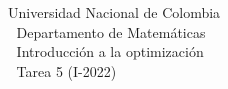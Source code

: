 \documentclass[12pt, oneside]{article}%
\begin{document}
\setlength{\parindent}{0cm}%
\hoffset-0.46cm
\voffset-1.46cm

\begin{window}
\Large  \hspace{0.5cm}\textsf{Universidad Nacional de Colombia} \\
\textcolor{white}{\tiny.}  \Large \hspace{0.6cm} \textsf{Departamento de Matemáticas} \\
\textcolor{white}{\tiny.}   \large\hspace{1.6cm}\textsf{Introducción a la optimización}\\
\textcolor{white}{\tiny.}   \large \hspace{2.6cm}\textsf{Tarea 5} \normalsize (I-2022)\\
\end{window}
\end{document}
